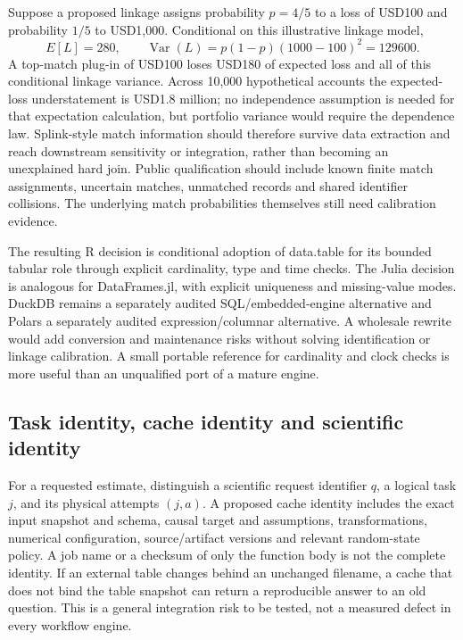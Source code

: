 Suppose a proposed linkage assigns probability $p=4/5$ to a loss of USD100 and probability $1/5$ to USD1,000. Conditional on this illustrative linkage model,
\[
 E[L]=280,\qquad
 \operatorname{Var}(L)=p(1-p)(1000-100)^2=129600.
\]
A top-match plug-in of USD100 loses USD180 of expected loss and all of this conditional linkage variance. Across 10,000 hypothetical accounts the expected-loss understatement is USD1.8 million; no independence assumption is needed for that expectation calculation, but portfolio variance would require the dependence law. Splink-style match information should therefore survive data extraction and reach downstream sensitivity or integration, rather than becoming an unexplained hard join. Public qualification should include known finite match assignments, uncertain matches, unmatched records and shared identifier collisions. The underlying match probabilities themselves still need calibration evidence.\citep{exec24_splink_sources,exec24_splink_contract,exec25_dww_choice}

The resulting R decision is conditional adoption of data.table for its bounded tabular role through explicit cardinality, type and time checks. The Julia decision is analogous for DataFrames.jl, with explicit uniqueness and missing-value modes. DuckDB remains a separately audited SQL/embedded-engine alternative and Polars a separately audited expression/columnar alternative. A wholesale rewrite would add conversion and maintenance risks without solving identification or linkage calibration. A small portable reference for cardinality and clock checks is more useful than an unqualified port of a mature engine.\citep{exec19_duckdb_source,exec19_duckdb_reference,exec23_polars_sources,exec23_polars_reference,exec25_otm_polars,exec25_dww_choice}

\subsection{Task identity, cache identity and scientific identity}

For a requested estimate, distinguish a scientific request identifier $q$, a logical task $j$, and its physical attempts $(j,a)$. A proposed cache identity includes the exact input snapshot and schema, causal target and assumptions, transformations, numerical configuration, source/artifact versions and relevant random-state policy. A job name or a checksum of only the function body is not the complete identity. If an external table changes behind an unchanged filename, a cache that does not bind the table snapshot can return a reproducible answer to an old question. This is a general integration risk to be tested, not a measured defect in every workflow engine.\citep{exec25_dww_choice,exec24_openlineage_source,exec24_openlineage_reference}


